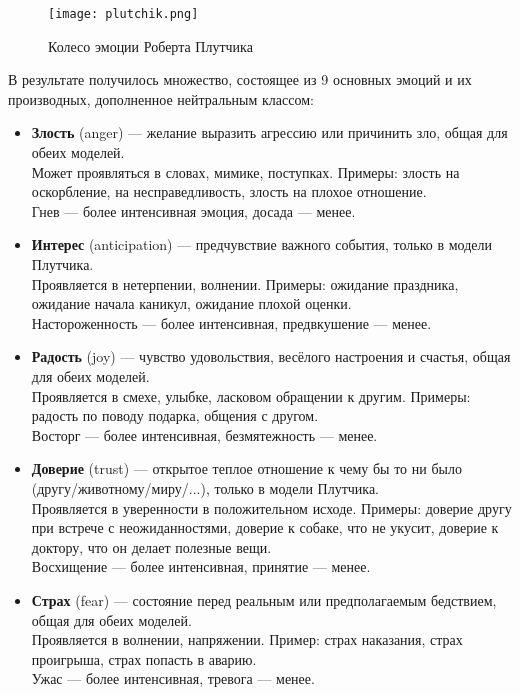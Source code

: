 \begin{figure}[ht]
    \centering
    \texttt{[image: plutchik.png]}
    \caption{Колесо эмоции Роберта Плутчика}
    \label{fig:plutchik}
\end{figure}

В результате получилось множество, состоящее из 9 основных эмоций и их производных, дополненное нейтральным классом:

\bigskip
\begin{itemize}
\item \textbf{Злость} (anger) --- желание выразить агрессию или причинить зло, общая для обеих моделей.\\
Может проявляться в словах, мимике, поступках.
Примеры: злость на оскорбление, на несправедливость, злость на плохое отношение.\\
Гнев --- более интенсивная эмоция, досада --- менее.

\item \textbf{Интерес} (anticipation) --- предчувствие важного события, только в модели Плутчика.\\
Проявляется в нетерпении, волнении.
Примеры: ожидание праздника, ожидание начала каникул, ожидание плохой оценки.\\
Настороженность --- более интенсивная, предвкушение --- менее.

\item \textbf{Радость} (joy) --- чувство удовольствия, весёлого настроения и счастья, общая для обеих моделей.\\
Проявляется в смехе, улыбке, ласковом обращении к другим.
Примеры: радость по поводу подарка, общения с другом.\\
Восторг --- более интенсивная, безмятежность --- менее.

\item \textbf{Доверие} (trust) --- ​открытое теплое отношение к чему бы то ни было (другу/животному/миру/...), только в модели Плутчика.\\
Проявляется в уверенности в положительном исходе.
Примеры: доверие другу при встрече с неожиданностями, доверие к собаке, что не укусит, доверие к доктору, что он делает полезные вещи.\\
Восхищение --- более интенсивная, принятие --- менее.

\item \textbf{Страх} (fear) --- состояние перед реальным или предполагаемым бедствием, общая для обеих моделей.\\
Проявляется в волнении, напряжении.
Пример: страх наказания, страх проигрыша, страх попасть в аварию.\\
Ужас --- более интенсивная, тревога --- менее.


\end{itemize}
